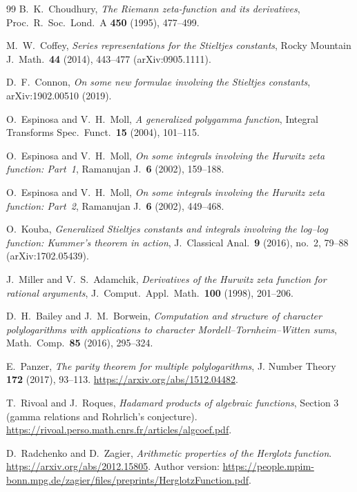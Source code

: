 \begin{thebibliography}{99}
B.~K.~Choudhury, \emph{The Riemann zeta-function and its derivatives},
Proc.\ R.\ Soc.\ Lond.\ A \textbf{450} (1995), 477--499.

M.~W.~Coffey, \emph{Series representations for the Stieltjes constants},
Rocky Mountain J.\ Math.\ \textbf{44} (2014), 443--477
(arXiv:0905.1111).

D.~F.~Connon, \emph{On some new formulae involving the Stieltjes constants},
arXiv:1902.00510 (2019).

O.~Espinosa and V.~H.~Moll, \emph{A generalized polygamma function},
Integral Transforms Spec.\ Funct.\ \textbf{15} (2004), 101--115.

O.~Espinosa and V.~H.~Moll, \emph{On some integrals involving the Hurwitz
zeta function: Part~1}, Ramanujan J.\ \textbf{6} (2002), 159--188.

O.~Espinosa and V.~H.~Moll, \emph{On some integrals involving the Hurwitz
zeta function: Part~2}, Ramanujan J.\ \textbf{6} (2002), 449--468.

O.~Kouba, \emph{Generalized Stieltjes constants and integrals involving the
log--log function: Kummer's theorem in action}, J.~Classical Anal.\
\textbf{9} (2016), no.~2, 79--88 (arXiv:1702.05439).

J.~Miller and V.~S.~Adamchik, \emph{Derivatives of the Hurwitz zeta
function for rational arguments}, J.~Comput.\ Appl.\ Math.\ \textbf{100}
(1998), 201--206.

D.~H.~Bailey and J.~M.~Borwein,
  \emph{Computation and structure of character polylogarithms with
  applications to character Mordell--Tornheim--Witten sums},
  Math.\ Comp.\ \textbf{85} (2016), 295--324.

E.~Panzer, \emph{The parity theorem for multiple polylogarithms},
J. Number Theory \textbf{172} (2017), 93--113.
\url{https://arxiv.org/abs/1512.04482}.

T.~Rivoal and J.~Roques, \emph{Hadamard products of algebraic functions},
Section 3 (gamma relations and Rohrlich's conjecture).
\url{https://rivoal.perso.math.cnrs.fr/articles/algcoef.pdf}.

D.~Radchenko and D.~Zagier, \emph{Arithmetic properties of the Herglotz function}.
\url{https://arxiv.org/abs/2012.15805}.
Author version: \url{https://people.mpim-bonn.mpg.de/zagier/files/preprints/HerglotzFunction.pdf}.


\end{thebibliography}
